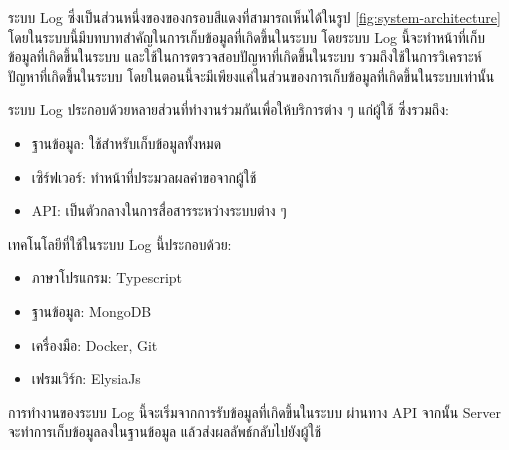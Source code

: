 \ifenglish
\else
ระบบ Log ซึ่งเป็นส่วนหนึ่งของของกรอบสีแดงที่สามารถเห็นได้ในรูป \ref{fig:system-architecture} โดยในระบบนี้มีบทบาทสำคัญในการเก็บข้อมูลที่เกิดขึ้นในระบบ โดยระบบ Log นี้จะทำหน้าที่เก็บข้อมูลที่เกิดขึ้นในระบบ และใช้ในการตรวจสอบปัญหาที่เกิดขึ้นในระบบ รวมถึงใช้ในการวิเคราะห์ปัญหาที่เกิดขึ้นในระบบ โดยในตอนนี้จะมีเพียงแค่ในส่วนของการเก็บข้อมูลที่เกิดขึ้นในระบบเท่านั้น

ระบบ Log ประกอบด้วยหลายส่วนที่ทำงานร่วมกันเพื่อให้บริการต่าง ๆ แก่ผู้ใช้ ซึ่งรวมถึง:
\begin{itemize}
    \item ฐานข้อมูล: ใช้สำหรับเก็บข้อมูลทั้งหมด
    \item เซิร์ฟเวอร์: ทำหน้าที่ประมวลผลคำขอจากผู้ใช้
    \item API: เป็นตัวกลางในการสื่อสารระหว่างระบบต่าง ๆ
\end{itemize}

เทคโนโลยีที่ใช้ในระบบ Log นี้ประกอบด้วย:
\begin{itemize}
    \item ภาษาโปรแกรม: Typescript
    \item ฐานข้อมูล: MongoDB
    \item เครื่องมือ: Docker, Git
    \item เฟรมเวิร์ก: ElysiaJs
\end{itemize}

การทำงานของระบบ Log นี้จะเริ่มจากการรับข้อมูลที่เกิดขึ้นในระบบ ผ่านทาง API จากนั้น Server จะทำการเก็บข้อมูลลงในฐานข้อมูล แล้วส่งผลลัพธ์กลับไปยังผู้ใช้
\fi